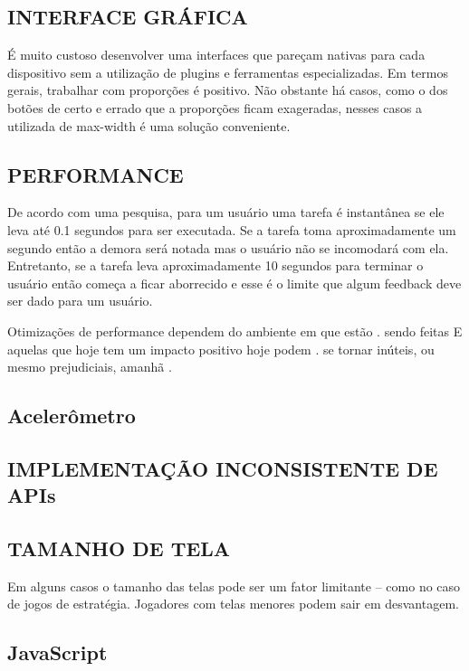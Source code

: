 \begin{draft}
\subsection{INTERFACE GRÁFICA}

É muito custoso desenvolver uma interfaces que pareçam nativas
para cada dispositivo sem a utilização de plugins e ferramentas
especializadas. Em termos gerais, trabalhar com proporções é
positivo. Não obstante
há casos, como o dos botões de certo e errado que a proporções ficam
exageradas, nesses casos a utilizada de max-width é uma solução
conveniente.

\subsection{PERFORMANCE}

De acordo com uma pesquisa, para um usuário uma tarefa é instantânea
se ele leva até 0.1 segundos para ser executada. Se a tarefa toma
aproximadamente um segundo então a demora será notada mas o
usuário não se incomodará com ela. Entretanto, se a tarefa leva
aproximadamente 10 segundos para terminar o usuário então começa a
ficar aborrecido e esse é o limite que algum feedback deve ser dado
para um usuário.

Otimizações de performance dependem do ambiente em que estão        .
sendo feitas E aquelas que hoje tem um impacto positivo hoje podem     .
se tornar inúteis, ou mesmo prejudiciais, amanhã \autocite[pp.       .
131]{html5mostwanted}                                                  .

\subsection{Acelerômetro}

\subsection{IMPLEMENTAÇÃO INCONSISTENTE DE APIs}

\subsection{TAMANHO DE TELA}
Em alguns casos o tamanho das telas pode ser um fator limitante – como
no caso de jogos de estratégia. Jogadores com telas menores podem sair
em desvantagem.

\subsection{JavaScript}


\end{draft}
